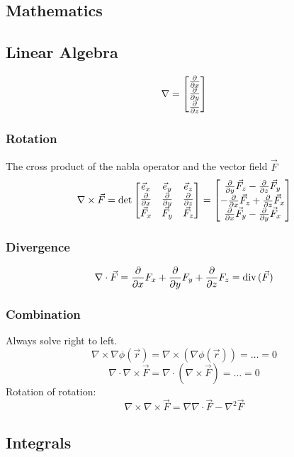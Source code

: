 \documentclass[a4paper, fontsize=8pt, landscape, DIV=1]{scrartcl}
\begin{document}
\begin{multicols*}{4}
  \section{Mathematics}
    \subsection{Linear Algebra}

    \[\nabla = \displaystyle \left[ \begin{matrix} \frac{\partial}{\partial x}\\\frac{\partial}{\partial y}\\\frac{\partial}{\partial z} \end{matrix} \right] \]
    
    \subsubsection{Rotation}
    The cross product of the nabla operator and the vector field $\vec{F}$
    \[ \nabla \times \vec{F} = \det \displaystyle \left[ \begin{matrix} \vec{e}_x & \vec{e}_y & \vec{e}_z \\ \frac{\partial}{\partial x} & \frac{\partial}{\partial y} & \frac{\partial}{\partial z} \\ \vec{F}_x&\vec{F}_y&\vec{F}_z \end{matrix} \right] = \displaystyle \left[ \begin{matrix} \frac{\partial}{\partial y}\vec{F}_z - \frac{\partial}{\partial z}\vec{F}_y \\ -\frac{\partial}{\partial x}\vec{F}_z + \frac{\partial}{\partial z}\vec{F}_x \\ \frac{\partial}{\partial x}\vec{F}_y - \frac{\partial}{\partial y}\vec{F}_x  \end{matrix} \right] \]

    \subsubsection{Divergence}
    \[\nabla \cdot \vec{F} = \frac{\partial}{\partial x}F_x + \frac{\partial}{\partial y}F_y + \frac{\partial}{\partial z}F_z = \text{div}\,(\vec{F})\]

    \subsubsection{Combination}
    Always solve right to left.
    \[ \nabla \times \nabla \phi(\vec{r}) = \nabla \times(\nabla\phi(\vec{r})) = \dots = 0 \]
    \[\nabla\cdot\nabla\times\vec{F} = \nabla\cdot(\nabla\times\vec{F}) = \dots = 0\]
    Rotation of rotation:
    \[\nabla\times\nabla\times\vec{F} = \nabla{\nabla\cdot\vec{F}}-\nabla^2\vec{F}\]

    \subsection{Integrals}

\end{multicols*}
\end{document}
